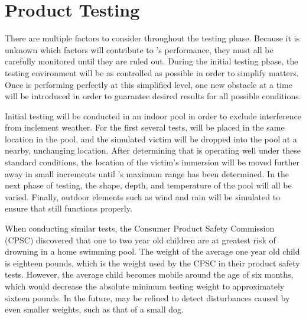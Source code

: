 \section{Product Testing}

There are multiple factors to consider throughout the testing phase. Because it is unknown which factors will contribute to \juicy’s performance, they must all be carefully monitored until they are ruled out. During the initial testing phase, the testing environment will be as controlled as possible in order to simplify matters. Once \juicy is performing perfectly at this simplified level, one new obstacle at a time will be introduced in order to guarantee desired results for all possible conditions.

Initial testing will be conducted in an indoor pool in order to exclude interference from inclement weather. For the first several tests, \juicy will be placed in the same location in the pool, and the simulated victim will be dropped into the pool at a nearby, unchanging location. After determining that \juicy is operating well under these standard conditions, the location of the victim’s immersion will be moved further away in small increments until \juicy’s maximum range has been determined. In the next phase of testing, the shape, depth, and temperature of the pool will all be varied. Finally, outdoor elements such as wind and rain will be simulated to ensure that \juicy still functions properly.

When conducting similar tests, the Consumer Product Safety Commission (CPSC) discovered that one to two year old children are at greatest risk of drowning in a home swimming pool. The weight of the average one year old child is eighteen pounds, which is the weight used by the CPSC in their product safety tests. However, the average child becomes mobile around the age of six months, which would decrease the absolute minimum testing weight to approximately sixteen pounds. In the future, \juicy may be refined to detect disturbances caused by even smaller weights, such as that of a small dog.